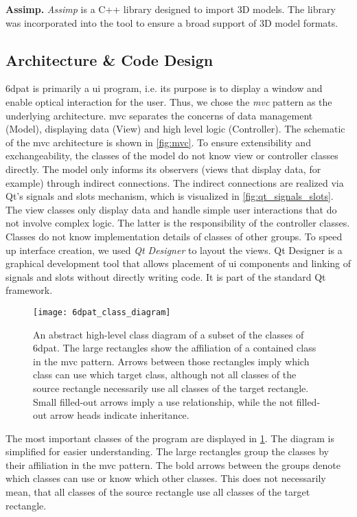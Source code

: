 \noindent\textbf{Assimp.} \textit{Assimp} \cite{assimp} is a C++ library designed to import 3D models. The library was incorporated into the tool to ensure a broad support of 3D model formats.

\subsection{Architecture \& Code Design}

\ac{6dpat} is primarily a \ac{ui} program, i.e. its purpose is to display a window and enable optical interaction for the user. Thus, we chose the \textit{\ac{mvc}} pattern as the underlying architecture. \ac{mvc} separates the concerns of data management (Model), displaying data (View) and high level logic (Controller). The schematic of the \ac{mvc} architecture is shown in \fig \ref{fig:mvc}. To ensure extensibility and exchangeability, the classes of the model do not know view or controller classes directly. The model only informs its observers (views that display data, for example) through indirect connections. The indirect connections are realized via Qt's signals and slots mechanism, which is visualized in \fig \ref{fig:qt_signals_slots}. The view classes only display data and handle simple user interactions that do not involve complex logic. The latter is the responsibility of the controller classes. Classes do not know implementation details of classes of other groups. To speed up interface creation, we used \textit{Qt Designer} to layout the views. Qt Designer is a graphical development tool that allows placement of \ac{ui} components and linking of signals and slots without directly writing code. It is part of the standard Qt framework.

\begin{figure}[!tbp]
       \centering
   \texttt{[image: 6dpat\_class\_diagram]}
    \caption{An abstract high-level class diagram of a subset of the classes of \ac{6dpat}. The large rectangles show the affiliation of a contained class in the \ac{mvc} pattern. Arrows between those rectangles imply which class can use which target class, although not all classes of the source rectangle necessarily use all classes of the target rectangle. Small filled-out arrows imply a use relationship, while the not filled-out arrow heads indicate inheritance.}
   \label{fig:6dpat_class_diagram}
\end{figure}

The most important classes of the program are displayed in \fig \ref{fig:6dpat_class_diagram}. The diagram is simplified for easier understanding. The large rectangles group the classes by their affiliation in the \ac{mvc} pattern. The bold arrows between the groups denote which classes can use or know which other classes. This does not necessarily mean, that all classes of the source rectangle use all classes of the target rectangle. 

